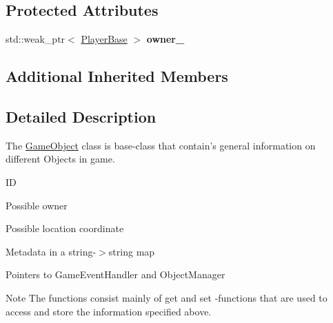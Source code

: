 \subsection*{Protected Attributes}
\begin{DoxyCompactItemize}
\item 
\hypertarget{class_course_1_1_game_object_a438c8b8567f6f3fbe8e4df6442ebd12e}{std\-::weak\-\_\-ptr$<$ \hyperlink{class_course_1_1_player_base}{Player\-Base} $>$ {\bfseries owner\-\_\-}}\label{class_course_1_1_game_object_a438c8b8567f6f3fbe8e4df6442ebd12e}

\end{DoxyCompactItemize}
\subsection*{Additional Inherited Members}


\subsection{Detailed Description}
The \hyperlink{class_course_1_1_game_object}{Game\-Object} class is base-\/class that contain's general information on different Objects in game. 


\begin{DoxyItemize}
\item I\-D
\item Possible owner
\item Possible location coordinate
\item Metadata in a string-\/$>$string map
\item Pointers to Game\-Event\-Handler and Object\-Manager
\end{DoxyItemize}

\begin{DoxyNote}{Note}
The functions consist mainly of get and set -\/functions that are used to access and store the information specified above. 
\end{DoxyNote}



